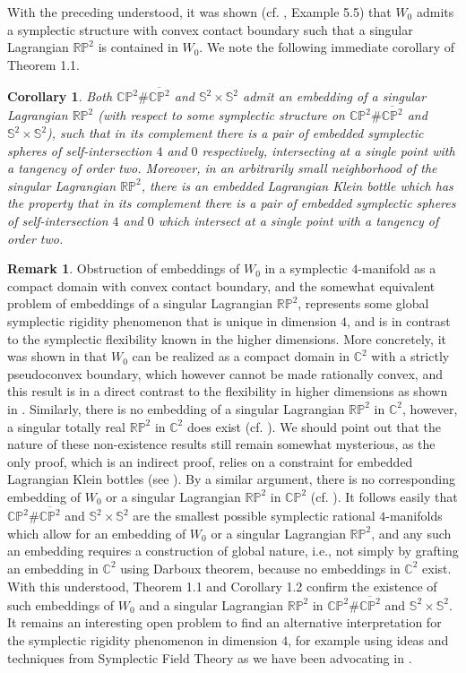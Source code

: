 \documentclass[11pt]{amsart}
\theoremstyle{plain}
\numberwithin{theorem}{section}
\newtheorem{corollary}[theorem]{Corollary}
\theoremstyle{definition}
\newtheorem{remark}[theorem]{Remark}
\newcommand{\C}{{\mathbb C}}
\newcommand{\R}{{\mathbb R}}
\renewcommand{\P}{{\mathbb P}}
\newcommand{\s}{{\mathbb S}}
\begin{document}
With the preceding understood, it was shown (cf. \cite{NS}, Example 5.5) that $W_0$ admits a symplectic structure with convex contact boundary such that a singular Lagrangian $\R\P^2$ is contained in $W_0$. We note the following immediate corollary of Theorem 1.1.

\begin{corollary}
Both $\C\P^2\# \overline{\C\P^2}$ and $\s^2\times \s^2$ admit an embedding of a singular 
Lagrangian $\R\P^2$ (with respect to some symplectic structure on $\C\P^2\# \overline{\C\P^2}$ 
and $\s^2\times \s^2$), such that in its complement there is a pair of embedded symplectic spheres of self-intersection $4$ and $0$ respectively, intersecting at a single point with a tangency of order two. Moreover,
in an arbitrarily small neighborhood of the singular Lagrangian $\R\P^2$, there is an embedded Lagrangian Klein bottle which has the property that in its complement there is a pair of embedded symplectic spheres of self-intersection $4$ and $0$ which intersect at a single point with a tangency of order two.
\end{corollary}

\begin{remark}
Obstruction of embeddings of $W_0$ in a symplectic $4$-manifold as a compact domain with convex contact boundary, and the somewhat equivalent problem of embeddings of a singular Lagrangian 
$\R\P^2$, represents some global symplectic rigidity phenomenon that is unique in dimension $4$,
and is in contrast to the symplectic flexibility known in the higher dimensions. More concretely, it was shown in \cite{NS} that $W_0$ can be realized as a compact domain in $\C^2$ with a strictly pseudoconvex boundary, which however cannot be made rationally convex, and this result is in 
a direct contrast to the flexibility in higher dimensions as shown in \cite{CE}. Similarly, there is no embedding of a singular Lagrangian $\R\P^2$ in $\C^2$, however, a singular totally real $\R\P^2$ 
in $\C^2$ does exist (cf. \cite{NS}). We should point out that the nature of these non-existence 
results still remain somewhat mysterious, as the only proof, which is an indirect proof, relies on
a constraint for embedded Lagrangian Klein bottles (see \cite{She, Nem}). By a similar argument, there is no corresponding embedding of $W_0$ or a singular Lagrangian $\R\P^2$ in $\C\P^2$ (cf. \cite{C}). It follows easily that $\C\P^2\# \overline{\C\P^2}$ and $\s^2\times \s^2$ are the smallest possible symplectic rational $4$-manifolds which allow for an embedding of $W_0$ or a singular Lagrangian $\R\P^2$, and any such an embedding requires a construction of global nature, i.e., not simply by grafting an embedding in $\C^2$ using Darboux theorem, because no embeddings in 
$\C^2$ exist. With this understood, Theorem 1.1 and
Corollary 1.2 confirm the existence of such embeddings of $W_0$ and a singular Lagrangian $\R\P^2$ in $\C\P^2\# \overline{\C\P^2}$ and $\s^2\times \s^2$. It remains an interesting open problem to find an alternative interpretation for the symplectic rigidity phenomenon in dimension $4$, for example using ideas and techniques from Symplectic Field Theory \cite{HWZ} as we have been advocating in \cite{C}. 
\end{remark}
\end{document}
